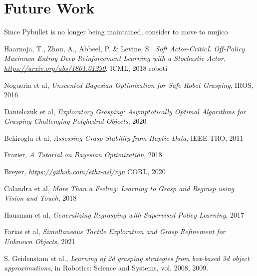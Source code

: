 \documentclass[12pt, a4paper]{report}
\theoremstyle{definition}
\begin{document}
\chapter{Future Work}
\label{chap:6}
Since Pybullet is no longer being maintained, consider to move to mujico



\appendix
\begin{thebibliography}{9}
    Haarnoja, T., Zhou, A., Abbeel, P. & Levine, S..
    \textit{Soft Actor-CriticL Off-Policy Maximum Entroy Deep Reinforcement Learning with a Stochastic Actor, \href{https://arxiv.org/abs/1801.01290}{https://arxiv.org/abs/1801.01290}},
    ICML,
    2018 roboti

    Nogueria et al,
    \textit{Unscented Bayesian Optimization for Safe Robot Grasping},
    IROS,
    2016

    Danielczuk et al,
    \textit{Exploratory Grasping: Asymptotically Optimal Algorithms for Grasping Challenging Polyhedral Objects},
    2020

    Bekiroglu et al,
    \textit{Assessing Grasp Stability from Haptic Data},
    IEEE TRO,
    2011

    Frazier,
    \textit{A Tutorial on Bayesian Optimization},
    2018

    Breyer,
    \textit{\href{https://github.com/ethz-asl/vgn}{https://github.com/ethz-asl/vgn}}
    CORL,
    2020

    Calandra et al,
    \textit{More Than a Feeling: Learning to Grasp and Regrasp using Vision and Touch},
    2018

    Hausman et al,
    \textit{Generalizing Regrasping with Supervised Policy Learning},
    2017

    Farias et al,
    \textit{Simultaneous Tactile Exploration and Grasp Refinement for Unknown Objects},
    2021

    S. Geidenstam et al.,
    \textit{Learning of 2d grasping strategies from box-based 3d object approximations}, in Robotics: Science and Systems, vol.
    2008, 2009.


\end{thebibliography}
\end{document}
